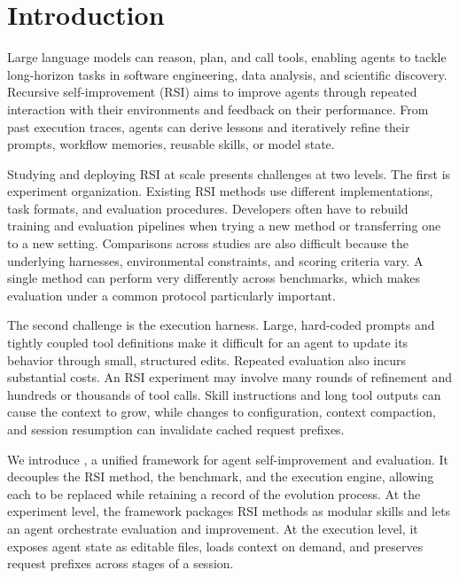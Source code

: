 \section{Introduction}

Large language models can reason, plan, and call tools, enabling agents to tackle long-horizon tasks in software engineering, data analysis, and scientific discovery. Recursive self-improvement (RSI) aims to improve agents through repeated interaction with their environments and feedback on their performance. From past execution traces, agents can derive lessons and iteratively refine their prompts, workflow memories, reusable skills, or model state.

Studying and deploying RSI at scale presents challenges at two levels. The first is experiment organization. Existing RSI methods use different implementations, task formats, and evaluation procedures. Developers often have to rebuild training and evaluation pipelines when trying a new method or transferring one to a new setting. Comparisons across studies are also difficult because the underlying harnesses, environmental constraints, and scoring criteria vary. A single method can perform very differently across benchmarks, which makes evaluation under a common protocol particularly important.

The second challenge is the execution harness. Large, hard-coded prompts and tightly coupled tool definitions make it difficult for an agent to update its behavior through small, structured edits. Repeated evaluation also incurs substantial costs. An RSI experiment may involve many rounds of refinement and hundreds or thousands of tool calls. Skill instructions and long tool outputs can cause the context to grow, while changes to configuration, context compaction, and session resumption can invalidate cached request prefixes.

We introduce \fwname, a unified framework for agent self-improvement and evaluation. It decouples the RSI method, the benchmark, and the execution engine, allowing each to be replaced while retaining a record of the evolution process. At the experiment level, the framework packages RSI methods as modular skills and lets an agent orchestrate evaluation and improvement. At the execution level, it exposes agent state as editable files, loads context on demand, and preserves request prefixes across stages of a session.


